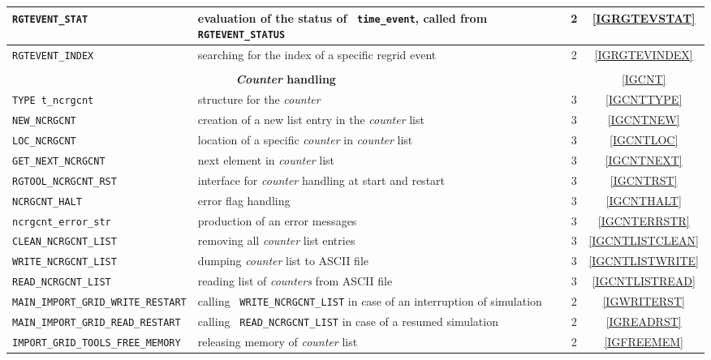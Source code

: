 \documentclass[11pt,twoside]{report}
\begin{document}
\begin{longtable}{|p{5cm}p{8.5cm}cc|}
{\color{blue} \tt RGTEVENT\_STAT} & evaluation of the status of {\tt
 time\_event}, called from \verb|RGTEVENT_STATUS| &  2& \ref{IGRGTEVSTAT} \\\hline
{\color{blue} \tt RGTEVENT\_INDEX} & searching for the index of a specific regrid
 event  &  2& \ref{IGRGTEVINDEX} \\\hline
& & & \\
\multicolumn{2}{|c}{\bf \Large {\it Counter} handling} & & \ref{IGCNT} \\ \hline
{\color{red} \tt TYPE t\_ncrgcnt}    &  structure for the {\it counter} & 3 & \ref{IGCNTTYPE} \\\hline
{\color{blue} \tt NEW\_NCRGCNT } & creation of a new list entry in the {\it counter} list & 3 & \ref{IGCNTNEW} \\\hline
{\color{blue} \tt LOC\_NCRGCNT} & location of a specific {\it counter} in {\it counter} list  & 3 & \ref{IGCNTLOC} \\\hline
{\color{blue} \tt GET\_NEXT\_NCRGCNT} &  next element in {\it counter} list & 3 & \ref{IGCNTNEXT} \\\hline
{\color{blue} \tt RGTOOL\_NCRGCNT\_RST} & interface for {\it counter}
handling at start and restart& 3  & \ref{IGCNTRST} \\\hline
{\color{blue} \tt  NCRGCNT\_HALT} &  error flag handling & 3 & \ref{IGCNTHALT} \\\hline
{\color{blue} \tt ncrgcnt\_error\_str} &  production of an error messages & 3 & \ref{IGCNTERRSTR} \\\hline
{\color{blue} \tt CLEAN\_NCRGCNT\_LIST} &  removing all {\it counter} list entries& 3 & \ref{IGCNTLISTCLEAN} \\\hline
{\color{blue} \tt WRITE\_NCRGCNT\_LIST} &  dumping {\it counter} list to ASCII file & 3 & \ref{IGCNTLISTWRITE} \\\hline
{\color{blue} \tt READ\_NCRGCNT\_LIST} &  reading list of {\it counters} from ASCII file& 3 & \ref{IGCNTLISTREAD} \\\hline
{\color{blue} \tt \small MAIN\_IMPORT\_GRID\_WRITE\_RESTART} & calling {\tt
WRITE\_NCRGCNT\_LIST} in case of an interruption of simulation &
2 & \ref{IGWRITERST} \\\hline
{\color{blue} \tt \small MAIN\_IMPORT\_GRID\_READ\_RESTART} & calling {\tt
READ\_NCRGCNT\_LIST} in case of a resumed simulation &  2 & \ref{IGREADRST} \\\hline
{\color{blue} \tt \small IMPORT\_GRID\_TOOLS\_FREE\_MEMORY} & releasing memory of {\it counter} list &
2 & \ref{IGFREEMEM} \\\hline


\end{longtable}
\end{document}
